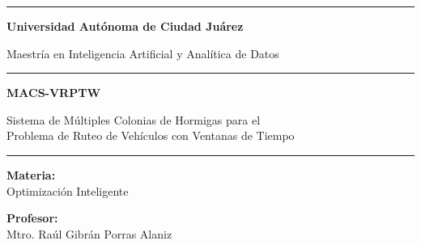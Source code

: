 \documentclass[12pt, letterpaper]{article}
\begin{document}
\begin{titlepage}
  \begin{center}

    \vspace*{1cm}


    \vspace{0.5cm}

    {\color{azulUACJ}\rule{\textwidth}{2pt}}

    \vspace{0.5cm}

    {\LARGE\bfseries\color{azulUACJ}
      Universidad Autónoma de Ciudad Juárez}

    \vspace{0.3cm}

    {\large\color{azulUACJ}
      Maestría en Inteligencia Artificial y Analítica de Datos}

    \vspace{0.3cm}

    {\color{oroUACJ}\rule{0.6\textwidth}{1pt}}

    \vspace{1.5cm}

    {\Huge\bfseries\color{azulUACJ}
      MACS-VRPTW}

    \vspace{0.5cm}

    {\Large\color{azulUACJ}
      Sistema de Múltiples Colonias de Hormigas para el\\
      Problema de Ruteo de Vehículos con Ventanas de Tiempo}

    \vspace{1.5cm}

    {\color{oroUACJ}\rule{0.6\textwidth}{1pt}}

    \vspace{1cm}

    {\large\bfseries\color{azulUACJ} Materia:}\\[0.3cm]
    {\large Optimización Inteligente}

    \vspace{0.8cm}

    {\large\bfseries\color{azulUACJ} Profesor:}\\[0.3cm]
    {\large Mtro. Raúl Gibrán Porras Alaniz}

    \vspace{0.8cm}


\end{center}
\end{titlepage}
\end{document}
